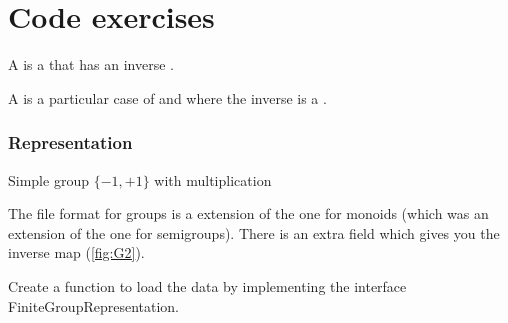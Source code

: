 \section{\usebox{\chaptergear} Code exercises}

A \Group is a \Monoid that has an inverse \Mapping.


A \FiniteGroup is a particular case of \Group and \FiniteMonoid where the inverse is a \FiniteMap.


\subsubsection*{Representation}

\begin{marginfigure}%
    \caption{Simple group $\{-1,+1\}$ with multiplication}%
    \label{fig:G2}%
\end{marginfigure}%


The file format for groups is a extension of the one for monoids (which was an extension of the one for semigroups).
There is an extra field  which gives you the inverse map (\cref{fig:G2}).


\begin{codeexercise}
    Create a function to load the data by implementing the interface FiniteGroupRepresentation.
\end{codeexercise}


